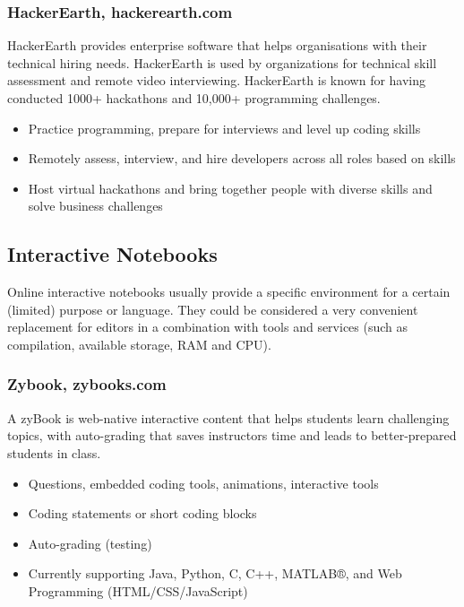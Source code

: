 \subsubsection{HackerEarth, hackerearth.com}

{HackerEarth provides enterprise software that helps organisations with their technical hiring needs. HackerEarth is used by organizations for technical skill assessment and remote video interviewing. HackerEarth is known for having conducted 1000+ hackathons and 10,000+ programming challenges.}

\begin{itemize}
\item
  {Practice programming, prepare for interviews and level up coding skills}
\item
  {Remotely assess, interview, and hire developers across all roles based on skills}
\item
  {Host virtual hackathons and bring together people with diverse skills and solve business challenges}
\end{itemize}

\subsection{Interactive Notebooks} \label{ssec:notebooks}

{Online interactive notebooks usually provide a specific environment for a certain (limited) purpose or language. They could be considered a very convenient replacement for editors in a combination with tools and services (such as compilation, available storage, RAM and CPU).}

\subsubsection{Zybook, zybooks.com}

{A zyBook is web-native interactive content that helps students learn challenging topics, with auto-grading that saves instructors time and leads to better-prepared students in class.}

\begin{itemize}
\item
  {Questions, embedded coding tools, animations, interactive tools}
\item
  {Coding statements or short coding blocks}
\item
  {Auto-grading (testing)}
\item
  {Currently supporting Java, Python, C, C++, MATLAB®, and Web Programming (HTML/CSS/JavaScript)}
\end{itemize}

